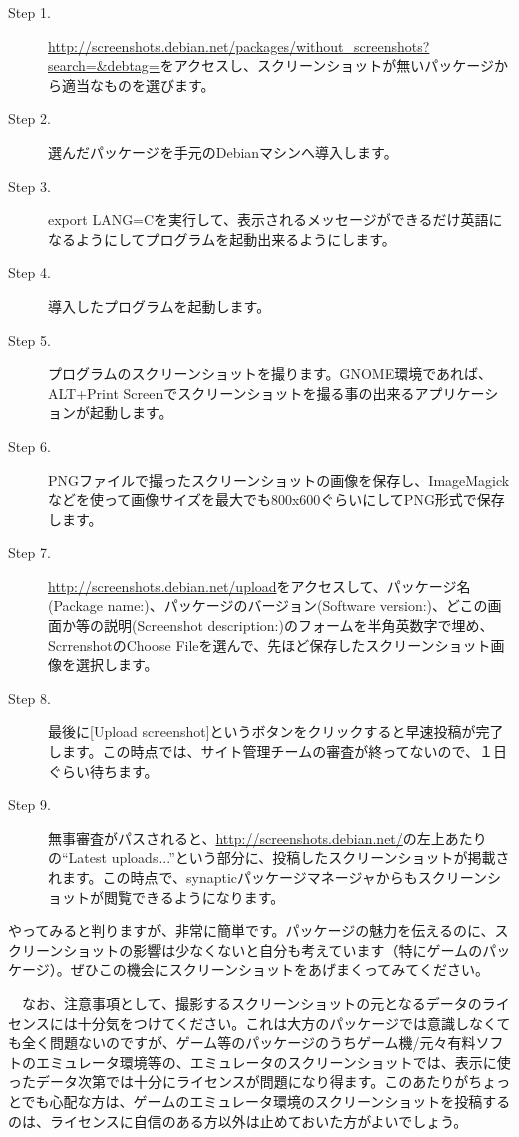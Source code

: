 \documentclass[mingoth,a4paper]{jsarticle}
\begin{document}
 \begin{description}
 \item [Step 1.] \url{http://screenshots.debian.net/packages/without_screenshots?search=&debtag=}をアクセスし、スクリーンショットが無いパッケージから適当なものを選びます。
 \item [Step 2.] 選んだパッケージを手元のDebianマシンへ導入します。
 \item [Step 3.] export LANG=Cを実行して、表示されるメッセージができるだけ英語になるようにしてプログラムを起動出来るようにします。
 \item [Step 4.] 導入したプログラムを起動します。
 \item [Step 5.] プログラムのスクリーンショットを撮ります。GNOME環境であれば、ALT+Print Screenでスクリーンショットを撮る事の出来るアプリケーションが起動します。
 \item [Step 6.] PNGファイルで撮ったスクリーンショットの画像を保存し、ImageMagickなどを使って画像サイズを最大でも800x600ぐらいにしてPNG形式で保存します。
 \item [Step 7.] \url{http://screenshots.debian.net/upload}をアクセスして、パッケージ名(Package name:)、パッケージのバージョン(Software version:)、どこの画面か等の説明(Screenshot description:)のフォームを半角英数字で埋め、ScrrenshotのChoose Fileを選んで、先ほど保存したスクリーンショット画像を選択します。
\item [Step 8.] 最後に[Upload screenshot]というボタンをクリックすると早速投稿が完了します。この時点では、サイト管理チームの審査が終ってないので、１日ぐらい待ちます。
\item [Step 9.] 無事審査がパスされると、\url{http://screenshots.debian.net/}の左上あたりの``Latest uploads...''という部分に、投稿したスクリーンショットが掲載されます。この時点で、synapticパッケージマネージャからもスクリーンショットが閲覧できるようになります。
\end{description}

やってみると判りますが、非常に簡単です。パッケージの魅力を伝えるのに、スクリーンショットの影響は少なくないと自分も考えています（特にゲームのパッケージ）。ぜひこの機会にスクリーンショットをあげまくってみてください。

　なお、注意事項として、撮影するスクリーンショットの元となるデータのライセンスには十分気をつけてください。これは大方のパッケージでは意識しなくても全く問題ないのですが、ゲーム等のパッケージのうちゲーム機/元々有料ソフトのエミュレータ環境等の、エミュレータのスクリーンショットでは、表示に使ったデータ次第では十分にライセンスが問題になり得ます。このあたりがちょっとでも心配な方は、ゲームのエミュレータ環境のスクリーンショットを投稿するのは、ライセンスに自信のある方以外は止めておいた方がよいでしょう。
\end{document}
